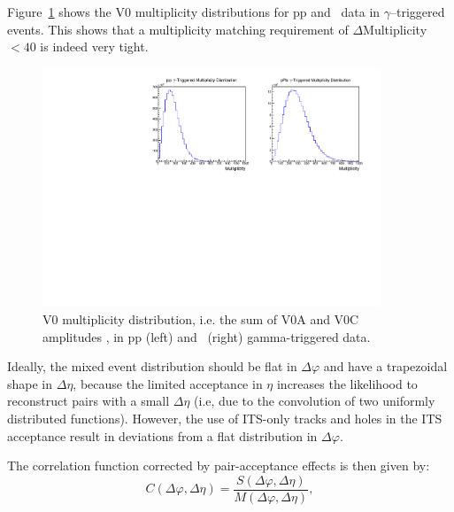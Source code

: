 Figure~\ref{fig:Multiplicitydistributions} shows the V0 multiplicity distributions for pp and \pPb~data in $\gamma$--triggered events. This shows that a multiplicity matching requirement of \(\Delta\)Multiplicity \(< 40\) is indeed very tight. 

\begin{figure}[h]
\center
\includegraphics[width=0.9\textwidth]{Data_Analysis/EventMixing/Abs_Multplicity_Dist.pdf}
\caption{V0 multiplicity distribution, i.e. the sum of V0A and V0C amplitudes , in pp (left) and \pPb~(right) gamma-triggered data.}
\label{fig:Multiplicitydistributions}
\end{figure}

Ideally, the mixed event distribution should be flat in \(\Delta\varphi\) and have a trapezoidal shape in \(\Delta\eta\), because the limited acceptance in \(\eta\) increases the likelihood to reconstruct pairs with a small \(\Delta\eta\) (i.e, due to the convolution of two uniformly distributed functions). However, the use of ITS-only tracks and holes in the ITS acceptance result in deviations from a flat distribution in \(\Delta\varphi\). %

The correlation function corrected by pair-acceptance effects is then given by:
\begin{equation}
\label{eq:Y}
C(\Delta \varphi, \Delta \eta) = \frac{S(\Delta \varphi, \Delta \eta)}{M(\Delta \varphi, \Delta \eta)},
\end{equation}


